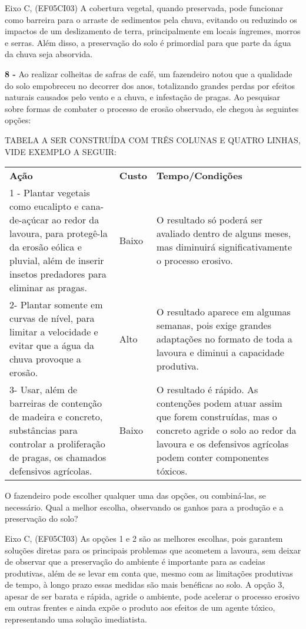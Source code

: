 Eixo C, (EF05CI03) A cobertura vegetal, quando preservada, pode
funcionar como barreira para o arraste de sedimentos pela chuva,
evitando ou reduzindo os impactos de um deslizamento de terra,
principalmente em locais íngremes, morros e serras. Além disso, a
preservação do solo é primordial para que parte da água da chuva seja
absorvida.

\textbf{8 -} Ao realizar colheitas de safras de café, um fazendeiro
notou que a qualidade do solo empobreceu no decorrer dos anos,
totalizando grandes perdas por efeitos naturais causados pelo vento e a
chuva, e infestação de pragas. Ao pesquisar sobre formas de combater o
processo de erosão observado, ele chegou às seguintes opções:

TABELA A SER CONSTRUÍDA COM TRÊS COLUNAS E QUATRO LINHAS, VIDE EXEMPLO A
SEGUIR:

\begin{longtable}[]{@{}lll@{}}
\toprule
\textbf{Ação} & \textbf{Custo} & \textbf{Tempo/Condições}\tabularnewline
1 - Plantar vegetais como eucalipto e cana-de-açúcar ao redor da
lavoura, para protegê-la da erosão eólica e pluvial, além de inserir
insetos predadores para eliminar as pragas. & Baixo & O resultado só
poderá ser avaliado dentro de alguns meses, mas diminuirá
significativamente o processo erosivo.\tabularnewline
2- Plantar somente em curvas de nível, para limitar a velocidade e
evitar que a água da chuva provoque a erosão. & Alto & O resultado
aparece em algumas semanas, pois exige grandes adaptações no formato de
toda a lavoura e diminui a capacidade produtiva.\tabularnewline
3- Usar, além de barreiras de contenção de madeira e concreto,
substâncias para controlar a proliferação de pragas, os chamados
defensivos agrícolas. & Baixo & O resultado é rápido. As contenções
podem atuar assim que forem construídas, mas o concreto agride o solo ao
redor da lavoura e os defensivos agrícolas podem conter componentes
tóxicos.\tabularnewline
\bottomrule
\end{longtable}

O fazendeiro pode escolher qualquer uma das opções, ou combiná-las, se
necessário. Qual a melhor escolha, observando os ganhos para a produção
e a preservação do solo?

Eixo C, (EF05CI03) As opções 1 e 2 são as melhores escolhas, pois
garantem soluções diretas para os principais problemas que acometem a
lavoura, sem deixar de observar que a preservação do ambiente é
importante para as cadeias produtivas, além de se levar em conta que,
mesmo com as limitações produtivas de tempo, à longo prazo essas medidas
são mais benéficas ao solo. A opção 3, apesar de ser barata e rápida,
agride o ambiente, pode acelerar o processo erosivo em outras frentes e
ainda expõe o produto aos efeitos de um agente tóxico, representando uma
solução imediatista.

